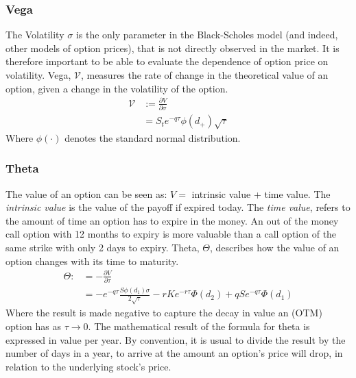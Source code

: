 \documentclass{article}
\begin{document}
\subsubsection{Vega}
The Volatility $\sigma$ is the only parameter in the Black-Scholes model (and indeed, other models of option prices), that is not directly observed in the market. It is therefore important to be able to evaluate the dependence of option price on volatility. Vega, $\mathcal{V}$, measures the rate of change in the theoretical value of an option, given a change in the volatility of the option. 
\begin{align*}
    \mathcal{V} &:= \frac{\partial V}{\partial \sigma} \\
    &= S_t e^{-q\tau}\phi(d_+)\sqrt{\tau}
\end{align*}
Where $\phi(\cdot)$ denotes the standard normal distribution. 

\subsubsection{Theta}
The value of an option can be seen as: $V = $ intrinsic value + time value. The \textit{intrinsic value} is the value of the payoff if expired today. The \textit{time value}, refers to the amount of time an option has to expire in the money. An out of the money call option with 12 months to expiry is more valuable than a call option of the same strike with only 2 days to expiry. Theta, $\Theta$, describes how the value of an option changes with its time to maturity. 
\begin{align*}
    \Theta :&= - \frac{\partial V}{\partial \tau} \\
            &= -e^{-q \tau} \frac{S \phi\left(d_{1}\right) \sigma}{2 \sqrt{\tau}}-r K e^{-r \tau} \Phi\left(d_{2}\right)+q S e^{-q \tau} \Phi\left(d_{1}\right)
\end{align*}
Where the result is made negative to capture the decay in value an (OTM) option has as $\tau\longrightarrow0$.
 The mathematical result of the formula for theta is expressed in value per year. By convention, it is usual to divide the result by the number of days in a year, to arrive at the amount an option's price will drop, in relation to the underlying stock's price. 
 
\end{document}
